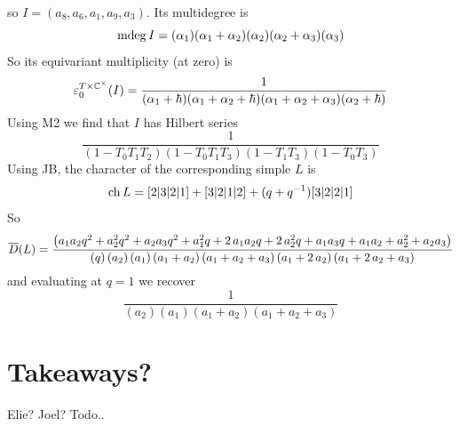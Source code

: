 \documentclass[11pt]{article}
\newcommand{\todo}[1]{{\color{red!50!white}\textbf{#1}}} %
\begin{document}
\begin{description}
$$$$
so $I = \left({a}_{8},{a}_{6},{a}_{1},{a}_{9},{a}_{3}\right)$. 
Its multidegree is
$$
\operatorname{mdeg} I 
= (\alpha_1) (\alpha_1 + \alpha_2) (\alpha_2) (\alpha_2 + \alpha_3) (\alpha_3)
$$ 
So its equivariant multiplicity (at zero) is 
$$
\varepsilon^{T\times\mathbb C^\times}_0(I) = 
\frac 1 {(\alpha_1 + \hbar)(\alpha_1 + \alpha_2 + \hbar) (\alpha_1 + \alpha_2 + \alpha_3)(\alpha_2 + \hbar)}
$$
Using M2 we find that $I$ has Hilbert series
\[
    \frac{1}{\left(1-{T}_{0}{T}_{1}{T}_{2}\right)\left(1-{T}_{0}{T}_{1}{T}_{3}\right)\left(1-{T}_{1}{T}_{3}\right)\left(1-{T}_{0}{T}_{3}\right)}
\]
Using JB, the character of the corresponding simple $L$ is 
\[
    \operatorname{ch} L = [2|3|2|1]+[3|2|1|2]+(q+q^{-1})[3|2|2|1]
\]
So 
{\small 
\[
    \overline{D}(L) = \frac{\left({a}_{1}{a}_{2}q^{2}+{a}_{2}^{2}q^{2}+{a}_{2}{a}_{3}q^{2}+{a}_{1}^{2}q+2\,{a}_{1}{a}_{2}q+2\,{a}_{2}^{2}q+{a}_{1}{a}_{3}q+{a}_{1}{a}_{2}+{a}_{2}^{2}+{a}_{2}{a}_{3}\right)}{\left(q\right)\left({a}_{2}\right)\left({a}_{1}\right)\left({a}_{1}+{a}_{2}\right)\left({a}_{1}+{a}_{2}+{a}_{
    3}\right)\left({a}_{1}+2\,{a}_{2}\right)\left({a}_{1}+2\,{a}_{2}+{a}_{3}\right)}
\]}
and evaluating at $q = 1$ we recover
\[
    \frac{1}{\left({a}_{2}\right)\left({a}_{1}\right)\left({a}_{1}+{a}_{2}\right)\left({a}_{1}+{a}_{2}+{a}_{3}\right)}    
\]
\end{description}
\section*{Takeaways?}
Elie? Joel? Todo.. 
%
%


%
%


%
\end{document}
